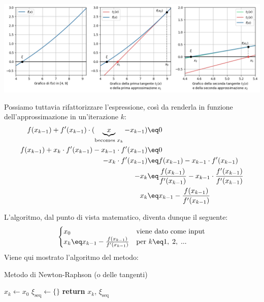 \begin{center}
    \includegraphics[trim=0 0 0 0, clip=false, width=\textwidth]{assets/image-004.png}
\end{center}

Possiamo tuttavia rifattorizzare l'espressione, così da renderla in funzione dell'approssimazione in un'iterazione $k$:
\begin{align*}
    f(x_{k - 1}) + f'(x_{k - 1}) \cdot (\underbrace{x}_{\text{becomes } x_k} - x_{k - 1}) &\eq 0 \\
    f(x_{k - 1}) + x_k \cdot f'(x_{k - 1}) - x_{k - 1} \cdot f'(x_{k - 1}) &\eq 0 \\
    -x_k \cdot f'(x_{k - 1}) &\eq f(x_{k - 1}) - x_{k - 1} \cdot f'(x_{k - 1}) \\
    -x_k &\eq \frac{f(x_{k - 1})}{f'(x_{k - 1})} - x_{k - 1} \cdot \frac{f'(x_{k - 1})}{f'(x_{k - 1})} \\
    x_k &\eq x_{k - 1} - \frac{f(x_{k - 1})}{f'(x_{k - 1})}
\end{align*}

L'algoritmo, dal punto di vista matematico, diventa dunque il seguente:
\[ \begin{cases}
    x_0 & \text{viene dato come input} \\
    x_k \eq x_{k - 1} - \frac{f(x_{k - 1})}{f'(x_{k - 1})} & \text{per } k \eq 1, \; 2, \; ...
\end{cases} \]
\nwl
Viene qui mostrato l'algoritmo del metodo:
\nwl
\begin{algorithm}[H]
    \caption{Metodo di Newton-Raphson (o delle tangenti)}
    $x_k \gets x_0$\;
    $\xi_{\text{seq}} \gets \{\}$\;
    \BlankLine
    \BlankLine
    \textbf{return} $x_k$, $\xi_{\text{seq}}$
\end{algorithm}


